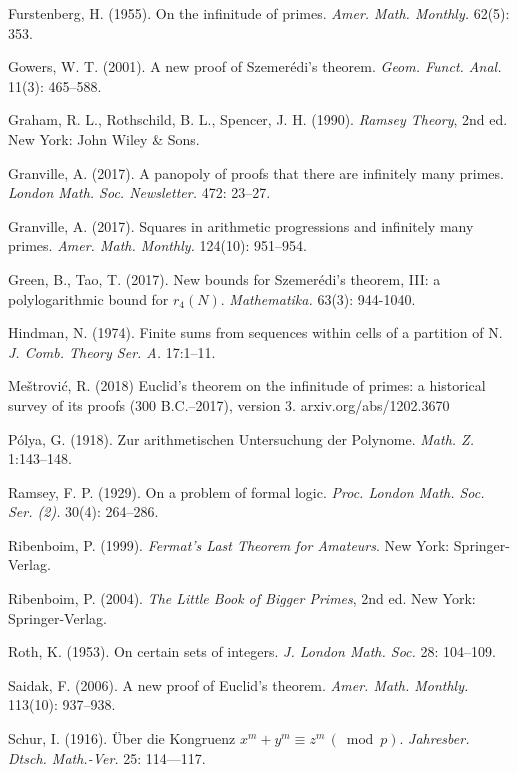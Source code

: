 \documentclass[12pt]{article}
\theoremstyle{theorem}
\theoremstyle{definition}
\begin{document}
\begin{thebibliography}{99}
  Furstenberg, H. (1955). On the infinitude of primes.
\textit{Amer. Math. Monthly.} 62(5): 353.


Gowers, W. T. (2001).
A new proof of Szemer\'{e}di's theorem.
\textit{Geom. Funct. Anal.} 11(3): 465--588. 

Graham, R. L., Rothschild, B. L., Spencer, J. H. (1990).
\textit{Ramsey Theory}, 2nd ed. New York: John Wiley \& Sons.

Granville, A. (2017).
A panopoly of proofs that there are infinitely many primes.
\textit{London Math. Soc. Newsletter.} 472: 23--27.

Granville, A. (2017). 
Squares in arithmetic progressions and infinitely many primes.
\textit{Amer. Math. Monthly.} 124(10): 951--954.

Green, B., Tao, T. (2017).
New bounds for Szemer\'{e}di's theorem, III: 
a polylogarithmic bound for $r_4(N)$.
\textit{Mathematika.} 63(3): 944-1040. 

Hindman, N. (1974).
Finite sums from sequences within cells of a partition of N. 
\textit{J. Comb. Theory Ser. A.} 17:1--11.

Me\v{s}trovi\'{c}, R. (2018)
Euclid's theorem on the infinitude of primes: 
a historical survey of its proofs (300 B.C.--2017), version 3.
arxiv.org/abs/1202.3670

P\'{o}lya, G. (1918).
Zur arithmetischen Untersuchung der Polynome.
\textit{Math. Z.} 1:143--148.

Ramsey, F. P. (1929).
On a problem of formal logic.
\textit{Proc. London Math. Soc. Ser. (2).} 30(4): 264--286. 


Ribenboim, P. (1999).
\textit{Fermat's Last Theorem for Amateurs}. 
New York: Springer-Verlag.

Ribenboim, P. (2004). 
\textit{The Little Book of Bigger Primes}, 2nd ed. New York: 
Springer-Verlag.

Roth, K. (1953). On certain sets of integers.
\textit{J. London Math. Soc.} 28: 104--109.

Saidak, F. (2006). A new proof of Euclid's theorem.
\textit{Amer. Math. Monthly.} 113(10): 937--938.

Schur, I. (1916).
\"Uber die Kongruenz $x^m + y^m \equiv z^m \, (\bmod p)$.
\textit{Jahresber. Dtsch. Math.-Ver.} 25: 114---117.


\end{thebibliography}
\end{document}
